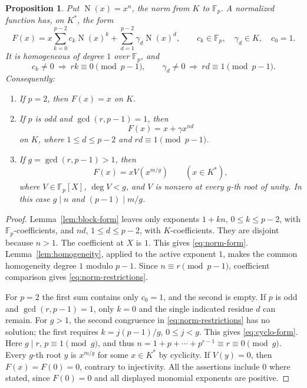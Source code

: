 \documentclass[11pt]{article}
\newtheorem{proposition}[theorem]{Proposition}
\theoremstyle{definition}
\theoremstyle{remark}
\newcommand{\Fp}{\mathbb F_p}
\newcommand{\Nrm}{\operatorname{N}}
\numberwithin{equation}{section}
\begin{document}
\begin{proposition}\label{prop:normal-form}
Put \(\Nrm(x)=x^n\), the norm from \(K\) to \(\Fp\).
A normalized function has, on \(K^*\), the form
\begin{equation}\label{eq:norm-form}
 F(x)=x\sum_{k=0}^{p-2}c_k\Nrm(x)^k
            +\sum_{d=1}^{p-2}\gamma_d\Nrm(x)^d,
 \qquad c_k\in\Fp,\quad \gamma_d\in K,\quad c_0=1.
\end{equation}
It is homogeneous of degree \(1\) over \(\Fp\), and
\begin{equation}\label{eq:norm-restrictions}
 c_k\ne0\ \Longrightarrow\ rk\equiv0\pmod{p-1},\qquad
 \gamma_d\ne0\ \Longrightarrow\ rd\equiv1\pmod{p-1}.
\end{equation}
Consequently:
\begin{enumerate}
\item If \(p=2\), then \(F(x)=x\) on \(K\).
\item If \(p\) is odd and \(\gcd(r,p-1)=1\), then
\begin{equation}\label{eq:binomial-form}
 F(x)=x+\gamma x^{nd}
\end{equation}
on \(K\), where \(1\le d\le p-2\) and \(rd\equiv1\pmod{p-1}\).
\item If \(g=\gcd(r,p-1)>1\), then
\begin{equation}\label{eq:cyclo-form}
 F(x)=xV(x^{m/g})\qquad(x\in K^*),
\end{equation}
where \(V\in\Fp[X]\), \(\deg V<g\), and \(V\) is nonzero at every
\(g\)-th root of unity. In this case \(g\mid n\) and
\((p-1)\mid m/g\).
\end{enumerate}
\end{proposition}
\begin{proof}
Lemma~\ref{lem:block-form} leaves only exponents
\(1+kn\), \(0\le k\le p-2\), with \(\Fp\)-coefficients, and
\(nd\), \(1\le d\le p-2\), with \(K\)-coefficients.
They are disjoint because \(n>1\). The coefficient at \(X\) is \(1\).
This gives \eqref{eq:norm-form}.
Lemma~\ref{lem:homogeneity}, applied to the active exponent \(1\),
makes the common homogeneity degree \(1\) modulo \(p-1\).
Since \(n\equiv r\pmod{p-1}\), coefficient comparison gives
\eqref{eq:norm-restrictions}.

For \(p=2\) the first sum contains only \(c_0=1\), and the second
is empty. If \(p\) is odd and \(\gcd(r,p-1)=1\), only \(k=0\)
and the single indicated residue \(d\) can remain.
For \(g>1\), the second congruence in
\eqref{eq:norm-restrictions} has no solution; the first requires
\(k=j(p-1)/g\), \(0\le j<g\). This gives \eqref{eq:cyclo-form}.
Here \(g\mid r\), \(p\equiv1\pmod g\), and thus
\(n=1+p+\cdots+p^{r-1}\equiv r\equiv0\pmod g\).
Every \(g\)-th root \(y\) is \(x^{m/g}\) for some \(x\in K^*\)
by cyclicity. If \(V(y)=0\), then \(F(x)=F(0)=0\), contrary to
injectivity. All the assertions include \(0\) where stated, since
\(F(0)=0\) and all displayed monomial exponents are positive.
\end{proof}
\end{document}

